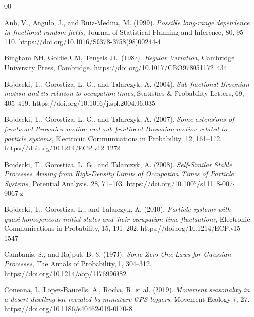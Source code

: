 \documentclass[preprint,12pt,authoryear]{elsarticle}
\begin{document}
\begin{thebibliography}{00}

  Anh, V., Angulo, J., and Ruiz-Medina, M. (1999). 
  \textit{Possible long-range dependence in fractional random fields},
  Journal of Statistical Planning and Inference,
  80,
  95–110. https://doi.org/10.1016/S0378-3758(98)00244-4

Bingham NH, Goldie CM, Teugels JL. (1987).
\textit{Regular Variation,}
Cambridge University Press, Cambridge.
https://doi.org/10.1017/CBO9780511721434

  Bojdecki, T., Gorostiza, L. G., and Talarczyk, A. (2004).
  \textit{Sub-fractional Brownian motion and its relation to occupation times},
  Statistics \& Probability Letters,
  69,
  405–419. https://doi.org/10.1016/j.spl.2004.06.035

  Bojdecki, T., Gorostiza, L. G., and Talarczyk, A. (2007).
  \textit{Some extensions of fractional Brownian motion and sub-fractional Brownian motion related to particle systems},
  Electronic Communications in Probability,
  12,
  161–172. https://doi.org/10.1214/ECP.v12-1272

  Bojdecki, T., Gorostiza, L. G., and Talarczyk, A. (2008).
  \textit{Self-Similar Stable Processes Arising from High-Density Limits of Occupation Times of Particle Systems},
  Potential Analysis,
  28,
  71–103. https://doi.org/10.1007/s11118-007-9067-z

  Bojdecki, T., Gorostiza, L., and Talarczyk, A. (2010).
  \textit{Particle systems with quasi-homogeneous initial states and their occupation time fluctuations},
  Electronic Communications in Probability,
  15,
  191--202. https://doi.org/10.1214/ECP.v15-1547

  Cambanis, S., and Rajput, B. S. (1973).
  \textit{Some Zero-One Laws for Gaussian Processes},
  The Annals of Probability,
  1,
  304–312. https://doi.org/10.1214/aop/1176996982

 Conenna, I., Lopez-Baucells, A., Rocha, R. et al. (2019). \textit{Movement seasonality in a desert-dwelling bat revealed by miniature GPS loggers}. Movement Ecology 7, 27. https://doi.org/10.1186/s40462-019-0170-8


\end{thebibliography}
\end{document}
